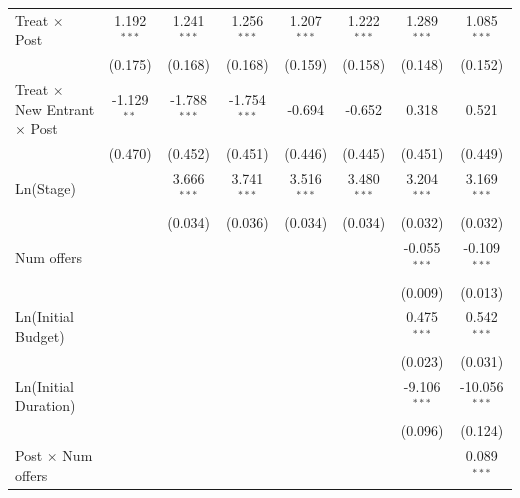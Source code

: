 \documentclass[
]{article}
\begin{document}
\begin{tabular}{lccccccc}
   Treat $\times$ Post                        & 1.192$^{***}$  & 1.241$^{***}$  & 1.256$^{***}$  & 1.207$^{***}$  & 1.222$^{***}$  & 1.289$^{***}$  & 1.085$^{***}$\\   
                                              & (0.175)        & (0.168)        & (0.168)        & (0.159)        & (0.158)        & (0.148)        & (0.152)\\   
   Treat $\times$ New Entrant $\times$ Post   & -1.129$^{**}$  & -1.788$^{***}$ & -1.754$^{***}$ & -0.694         & -0.652         & 0.318          & 0.521\\   
                                              & (0.470)        & (0.452)        & (0.451)        & (0.446)        & (0.445)        & (0.451)        & (0.449)\\   
   Ln(Stage)                                  &                & 3.666$^{***}$  & 3.741$^{***}$  & 3.516$^{***}$  & 3.480$^{***}$  & 3.204$^{***}$  & 3.169$^{***}$\\   
                                              &                & (0.034)        & (0.036)        & (0.034)        & (0.034)        & (0.032)        & (0.032)\\   
   Num offers                                 &                &                &                &                &                & -0.055$^{***}$ & -0.109$^{***}$\\   
                                              &                &                &                &                &                & (0.009)        & (0.013)\\   
   Ln(Initial Budget)                         &                &                &                &                &                & 0.475$^{***}$  & 0.542$^{***}$\\   
                                              &                &                &                &                &                & (0.023)        & (0.031)\\   
   Ln(Initial Duration)                       &                &                &                &                &                & -9.106$^{***}$ & -10.056$^{***}$\\   
                                              &                &                &                &                &                & (0.096)        & (0.124)\\   
   Post $\times$ Num offers                   &                &                &                &                &                &                & 0.089$^{***}$\\   

\end{tabular}
\end{document}
